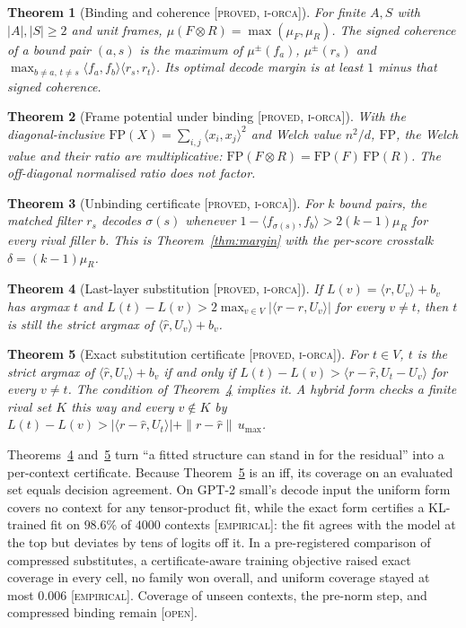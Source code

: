 \documentclass[11pt]{article}
\theoremstyle{definition}
\theoremstyle{plain}
\newtheorem{theorem}{Theorem}[section]
\theoremstyle{remark}
\newcommand{\proved}{\textsc{[proved, i-orca]}}
\newcommand{\empirical}{\textsc{[empirical]}}
\newcommand{\open}{\textsc{[open]}}
\begin{document}
\begin{theorem}[Binding and coherence \proved{}]\label{thm:bindcoh}
For finite $A,S$ with $|A|,|S|\ge2$ and unit frames, $\mu(F\otimes R)=\max(\mu_F,\mu_R)$. The signed coherence of a
bound pair $(a,s)$ is the maximum of $\mu^{\pm}(f_a)$, $\mu^{\pm}(r_s)$ and
$\max_{b\ne a,\,t\ne s}\langle f_a,f_b\rangle\langle r_s,r_t\rangle$. Its optimal decode margin is at least $1$ minus
that signed coherence.
\end{theorem}

\begin{theorem}[Frame potential under binding \proved{}]\label{thm:bindfp}
With the diagonal-inclusive $\mathrm{FP}(X)=\sum_{i,j}\langle x_i,x_j\rangle^2$ and Welch value $n^2/d$,
$\mathrm{FP}$, the Welch value and their ratio are multiplicative: $\mathrm{FP}(F\otimes R)=\mathrm{FP}(F)\,
\mathrm{FP}(R)$. The off-diagonal normalised ratio does not factor.
\end{theorem}

\begin{theorem}[Unbinding certificate \proved{}]\label{thm:unbind}
For $k$ bound pairs, the matched filter $r_s$ decodes $\sigma(s)$ whenever
$1-\langle f_{\sigma(s)},f_b\rangle>2(k-1)\mu_R$ for every rival filler $b$. This is Theorem~\ref{thm:margin} with
the per-score crosstalk $\delta=(k-1)\mu_R$.
\end{theorem}

\begin{theorem}[Last-layer substitution \proved{}]\label{thm:subst}
If $L(v)=\langle r,U_v\rangle+b_v$ has argmax $t$ and $L(t)-L(v)>2\max_{v\in V}|\langle r-\hat r,U_v\rangle|$ for
every $v\ne t$, then $t$ is still the strict argmax of $\langle\hat r,U_v\rangle+b_v$.
\end{theorem}

\begin{theorem}[Exact substitution certificate \proved{}]\label{thm:substpair}
For $t\in V$, $t$ is the strict argmax of $\langle\hat r,U_v\rangle+b_v$ if and only if
$L(t)-L(v)>\langle r-\hat r,U_t-U_v\rangle$ for every $v\ne t$. The condition of Theorem~\ref{thm:subst} implies
it. A hybrid form checks a finite rival set $K$ this way and every $v\notin K$ by
$L(t)-L(v)>|\langle r-\hat r,U_t\rangle|+\|r-\hat r\|\,u_{\max}$.
\end{theorem}

\noindent Theorems~\ref{thm:subst} and~\ref{thm:substpair} turn ``a fitted structure can stand in for the
residual'' into a per-context certificate. Because Theorem~\ref{thm:substpair} is an iff, its coverage on an
evaluated set equals decision agreement. On GPT-2 small's decode input the uniform form covers no context for any
tensor-product fit, while the exact form certifies a KL-trained fit on $98.6\%$ of $4000$ contexts \empirical{}:
the fit agrees with the model at the top but deviates by tens of logits off it. In a pre-registered comparison of
compressed substitutes, a certificate-aware training objective raised exact coverage in every cell, no family won
overall, and uniform coverage stayed at most $0.006$ \empirical{}. Coverage of unseen contexts, the pre-norm step,
and compressed binding remain \open{}.
\end{document}
